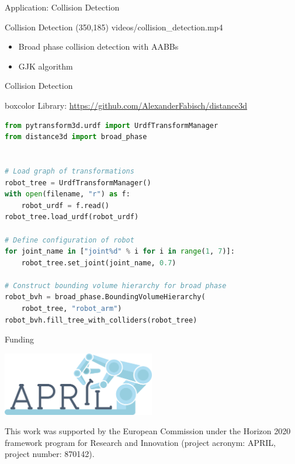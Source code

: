 \documentclass[14pt,aspectratio=169]{beamer}
\begin{document}
\begin{frame}
\begin{center}
\Large
Application: Collision Detection
\end{center}
\end{frame}

\begin{frame}{Collision Detection}
\makebox(350,185){
{videos/collision_detection.mp4}}
\begin{itemize}
\item Broad phase collision detection with AABBs
\item GJK algorithm \parencite{Gilbert1988}
\end{itemize}
\end{frame}

\begin{frame}[fragile]{Collision Detection}
\begin{beamercolorbox}[wd=\textwidth,sep=5pt]{boxcolor}
\centering
{\footnotesize Library:
\url{https://github.com/AlexanderFabisch/distance3d}}
\end{beamercolorbox}

\begin{lstlisting}[language=Python]
from pytransform3d.urdf import UrdfTransformManager
from distance3d import broad_phase


# Load graph of transformations
robot_tree = UrdfTransformManager()
with open(filename, "r") as f:
    robot_urdf = f.read()
robot_tree.load_urdf(robot_urdf)

# Define configuration of robot
for joint_name in ["joint%d" % i for i in range(1, 7)]:
    robot_tree.set_joint(joint_name, 0.7)

# Construct bounding volume hierarchy for broad phase
robot_bvh = broad_phase.BoundingVolumeHierarchy(
    robot_tree, "robot_arm")
robot_bvh.fill_tree_with_colliders(robot_tree)
\end{lstlisting}
\end{frame}

\begin{frame}{Funding}
\begin{center}
\includegraphics[width=0.5\textwidth]{images/logo_april}
\end{center}
This work was supported by the European Commission under the Horizon 2020
framework program for Research and Innovation (project acronym: APRIL, project
number: 870142).
\end{frame}
\end{document}
